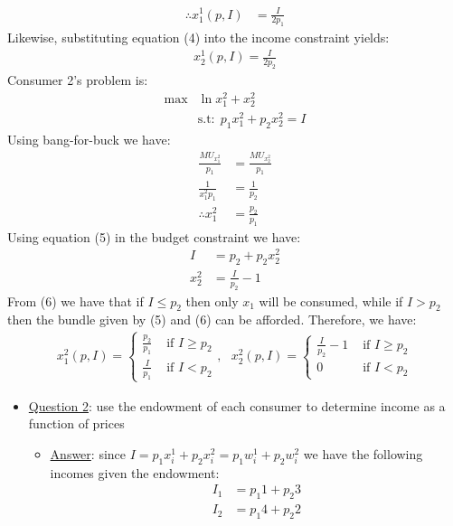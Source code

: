 \documentclass{article}
\begin{document}
\begin{itemize}
\begin{itemize}
\begin{align*}
        \therefore x_{1}^{1}(p,I) &= \frac{I}{2p_{1}}
      \end{align*}
      Likewise, substituting equation (4) into the income constraint yields:
      \begin{gather*}
        x_{2}^{1}(p,I) = \frac{I}{2p_{2}}
      \end{gather*}
      Consumer 2's problem is:
      \begin{align*}
        \max & \ln x_{1}^{2} + x_{2}^{2} \\
        &\text{s.t:} \ \ p_{1}x_{1}^{2} + p_{2}x_{2}^{2} = I
      \end{align*}
      Using bang-for-buck we have:
      \begin{align*}
        \frac{MU_{x_{1}^{2}}}{p_{1}} &= \frac{MU_{x_{2}^{2}}}{p_{1}} \\
        \frac{1}{x_{1}^{2}p_{1}} &= \frac{1}{p_{2}} \\
        \therefore x_{1}^{2} &= \frac{p_{2}}{p_{1}} \ \tag{5}
      \end{align*}
      Using equation (5) in the budget constraint we have:
      \begin{align*}
        I &= p_{2} + p_{2}x_{2}^{2} \\
        x_{2}^{2} &= \frac{I}{p_{2}} - 1 \ \tag{6}
      \end{align*}
      From (6) we have that if $I \leq p_{2}$ then only $x_{1}$ will be consumed, while if $I > p_{2}$ then the bundle given by (5) and (6) can be afforded. Therefore, we have:
      \begin{gather*}
        x_{1}^{2}(p,I) =
        \begin{cases}
          \frac{p_{2}}{p_{1}} & \text{ if } I \geq p_{2} \\
          \frac{I}{p_{1}} & \text{ if } I < p_{2}
         \end{cases}
         , \ \ \
         x_{2}^{2}(p,I) =
         \begin{cases}
           \frac{I}{p_{2}} - 1 & \text{ if } I \geq p_{2} \\
           0 & \text{ if } I < p_{2}
          \end{cases}
      \end{gather*}
    \end{itemize}
  \end{itemize}
  \begin{itemize}
    \item  \underline{Question 2}: use the endowment of each consumer to determine income as a function of prices
    \begin{itemize}
      \item  \underline{Answer}: since $I = p_{1}x_{i}^{1} + p_{2}x_{i}^{2} = p_{1}w_{i}^{1} + p_{2}w_{i}^{2}$ we have the following incomes given the endowment:
      \begin{align*}
        I_{1} &= p_{1}1 + p_{2}3 \\
        I_{2} &= p_{1}4 + p_{2}2
      \end{align*}
    \end{itemize}
  \end{itemize}
\end{document}
